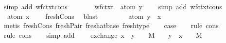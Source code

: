 \begin{isabellebody}
\ {\isacharparenleft}simp\ add{\isacharcolon}\ wf{\isacharunderscore}ctxt{\isacharunderscore}cons{\isacharparenright}{\isacharplus}\isanewline
\ \ \isamarkupfalse%
\ {}{\isacharparenleft}{}{\isacharparenright}\ \isamarkupfalse%
\ {}{\isacharcolon}\ {\isachardoublequoteopen}wf{\isacharunderscore}ctxt\ {\isasymGamma}{\isachardoublequoteclose}\ {\isachardoublequoteopen}atom\ y\ {\isasymsharp}\ {\isasymGamma}{\isachardoublequoteclose}\ \isamarkupfalse%
\ {\isacharparenleft}simp\ add{\isacharcolon}\ wf{\isacharunderscore}ctxt{\isacharunderscore}cons{\isacharparenright}{\isacharplus}\isanewline
\ \ \isamarkupfalse%
\ {}{\isacharparenleft}{}{\isacharparenright}\ \isamarkupfalse%
\ {}{\isacharcolon}\ {\isachardoublequoteopen}atom\ x\ {\isasymsharp}\ {\isasymGamma}{\isachardoublequoteclose}\ \isamarkupfalse%
\ fresh{\isacharunderscore}Cons\ \isamarkupfalse%
\ blast\isanewline
\ \ \isamarkupfalse%
\ {}{\isacharparenleft}{}{\isacharparenright}\ {}{\isacharparenleft}{}{\isacharparenright}\ \isamarkupfalse%
\ {}{\isacharcolon}\ {\isachardoublequoteopen}atom\ y\ {\isasymsharp}\ {\isacharparenleft}{\isacharparenleft}x{\isacharcomma}{\isasymsigma}{\isacharparenright}\ {\isacharhash}\ {\isasymGamma}{\isacharparenright}{\isachardoublequoteclose}\ \isamarkupfalse%
\ {\isacharparenleft}metis\ fresh{\isacharunderscore}Cons\ fresh{\isacharunderscore}Pair\ fresh{\isacharunderscore}at{\isacharunderscore}base{\isacharparenleft}{}{\isacharparenright}\ fresh{\isacharunderscore}type{\isacharparenright}\isanewline
\isanewline
\ \ \isamarkupfalse%
\ {\isacharquery}case\isanewline
\ \ \isamarkupfalse%
\ {\isacharparenleft}rule\ cons{\isacharparenright}\isanewline
\ \ \isamarkupfalse%
\ {\isacharparenleft}rule\ cons{\isacharparenright}\isanewline
\ \ \isamarkupfalse%
\ {\isacharparenleft}simp\ add{\isacharcolon}\ {}\ {}\ {}{\isacharparenright}{\isacharplus}\isanewline
{}\isamarkupfalse%
%
\endisatagproof
{\isafoldproof}%
%
\isadelimproof
\isanewline
%
\endisadelimproof
\isanewline
{}\isamarkupfalse%
\ exchange{\isacharcolon}\ {\isachardoublequoteopen}{\isacharparenleft}x{\isacharcomma}{\isasymsigma}{\isacharparenright}\ {\isacharhash}\ {\isacharparenleft}y{\isacharcomma}{\isasympi}{\isacharparenright}\ {\isacharhash}\ {\isasymGamma}\ {\isasymturnstile}\ M\ {\isacharcolon}\ {\isasymdelta}\ {\isasymLongrightarrow}\ {\isacharparenleft}y{\isacharcomma}{\isasympi}{\isacharparenright}\ {\isacharhash}\ {\isacharparenleft}x{\isacharcomma}{\isasymsigma}{\isacharparenright}\ {\isacharhash}\ {\isasymGamma}\ {\isasymturnstile}\ M\ {\isacharcolon}\ {\isasymdelta}{\isachardoublequoteclose}\isanewline

\end{isabellebody}
